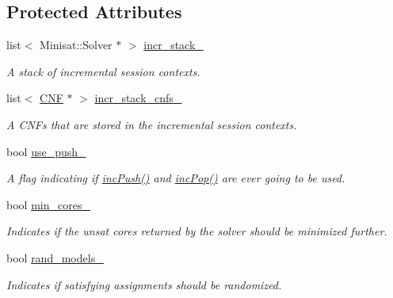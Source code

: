\subsection*{Protected Attributes}
\begin{DoxyCompactItemize}
\item 
list$<$ Minisat\-::\-Solver $\ast$ $>$ \hyperlink{classMiniSatApi_ab9dcac91d11eef23cc40d7478464c414}{incr\-\_\-stack\-\_\-}
\begin{DoxyCompactList}\small\item\em A stack of incremental session contexts. \end{DoxyCompactList}\item 
list$<$ \hyperlink{classCNF}{C\-N\-F} $\ast$ $>$ \hyperlink{classMiniSatApi_aca2da2d02879e4a05c09124ff84cc4cd}{incr\-\_\-stack\-\_\-cnfs\-\_\-}
\begin{DoxyCompactList}\small\item\em A C\-N\-Fs that are stored in the incremental session contexts. \end{DoxyCompactList}\item 
bool \hyperlink{classMiniSatApi_a9d1530348f713264a41d6115e4cfb62e}{use\-\_\-push\-\_\-}
\begin{DoxyCompactList}\small\item\em A flag indicating if \hyperlink{classMiniSatApi_a27013ace25320f68252bef5ba9f2e9ad}{inc\-Push()} and \hyperlink{classMiniSatApi_af388f97db15f77baeb420a8fef74ca6a}{inc\-Pop()} are ever going to be used. \end{DoxyCompactList}\item 
bool \hyperlink{classSatSolver_adfeecebfd09606c82b5c57cfe5aad813}{min\-\_\-cores\-\_\-}
\begin{DoxyCompactList}\small\item\em Indicates if the unsat cores returned by the solver should be minimized further. \end{DoxyCompactList}\item 
bool \hyperlink{classSatSolver_a73fed24d8fb4da85ef82dc53ac5f28c7}{rand\-\_\-models\-\_\-}
\begin{DoxyCompactList}\small\item\em Indicates if satisfying assignments should be randomized. \end{DoxyCompactList}\end{DoxyCompactItemize}

